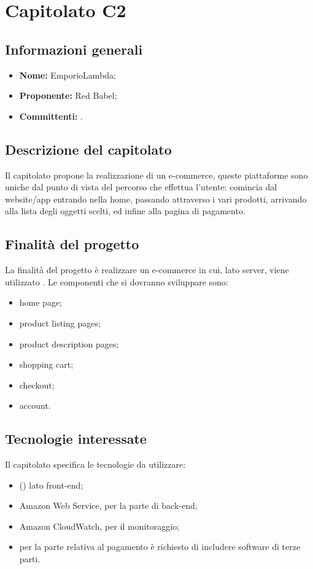 \section{Capitolato C2}

\subsection{Informazioni generali}
\begin{itemize}
\item \textbf{Nome:} EmporioLambda;
\item \textbf{Proponente:} Red Babel;
\item \textbf{Committenti:} \committenti{}.
\end{itemize}

\subsection{Descrizione del capitolato}
Il capitolato propone la realizzazione di un e-commerce, queste piattaforme sono uniche dal punto di vista del percorso che effettua l'utente: comincia dal website/app entrando nella home, passando attraverso i vari prodotti, arrivando alla lista degli oggetti scelti, ed infine alla pagina di pagamento. 

\subsection{Finalità del progetto}
La finalità del progetto è realizzare un e-commerce in cui, lato server, viene utilizzato . Le componenti che si dovranno sviluppare sono:
\begin{itemize}
\item home page;
\item product listing pages;
\item product description pages;
\item shopping cart;
\item checkout;
\item account.
\end{itemize}

\subsection{Tecnologie interessate}
Il capitolato specifica le tecnologie da utilizzare:
\begin{itemize}
\item {} () lato front-end;
\item Amazon Web Service, per la parte di back-end;
\item Amazon CloudWatch, per il monitoraggio;
\item per la parte relativa al pagamento è richiesto di includere software di terze parti.
\end{itemize}

